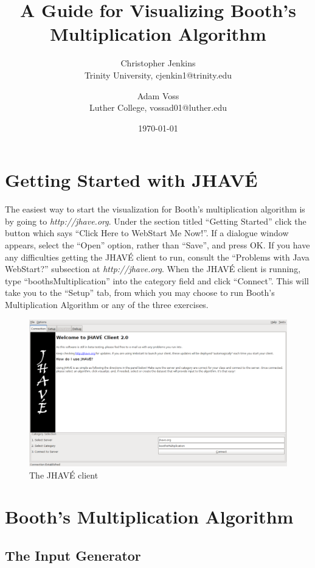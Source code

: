 \documentclass{article}
\title{A Guide for Visualizing Booth's Multiplication Algorithm}
\date{\today}
\author{Christopher Jenkins\\ Trinity University, cjenkin1@trinity.edu
    \and Adam Voss\\ Luther College, vossad01@luther.edu}
\begin{document}
\maketitle
\tableofcontents

\pagebreak

\section{Getting Started with JHAVÉ}
The easiest way to start the visualization for Booth's multiplication algorithm is by going to \emph{http://jhave.org}.
Under the section titled ``Getting Started'' click the button which says ``Click Here to WebStart Me Now!''.
If a dialogue window appears, select the ``Open'' option, rather than ``Save'', and press OK.
If you have any difficulties getting the JHAVÉ client to run, consult the ``Problems with Java WebStart?'' subsection at \emph{http://jhave.org}.
When the JHAVÉ client is running, type ``boothsMultiplication'' into the category field and click ``Connect''.
This will take you to the ``Setup'' tab, from which you may choose to run Booth's Multiplication Algorithm or any of the three exercises.

\begin{figure}[h]
\centering
\includegraphics[scale=0.3]{start.pdf}
\caption{The JHAVÉ client}
\end{figure}

\pagebreak

\section{Booth's Multiplication Algorithm}
\subsection{The Input Generator}
\end{document}
